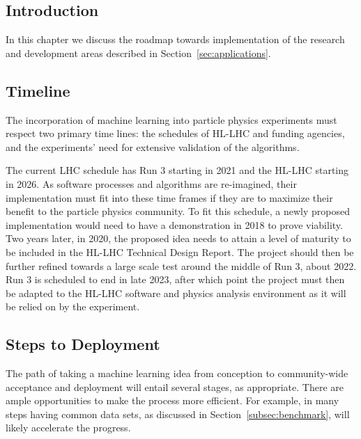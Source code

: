 
\subsection{Introduction}
In this chapter we discuss the roadmap towards implementation of the research and development areas described in Section~\ref{sec:applications}.

\subsection{Timeline}
The incorporation of machine learning into particle physics experiments must respect two primary time lines: the schedules of HL-LHC and funding agencies, and the experiments' need for extensive validation of the algorithms.

The current LHC schedule has Run 3 starting in 2021 and the HL-LHC starting in 2026. As software processes and algorithms are re-imagined, their implementation must fit into these time frames if they are to maximize their benefit to the particle physics community. To fit this schedule, a newly proposed implementation would need to have a demonstration in 2018 to prove viability. Two years later, in 2020, the proposed idea needs to attain a level of maturity to be included in the HL-LHC Technical Design Report. The project should then be further refined towards a large scale test around the middle of Run 3, about 2022. Run 3 is scheduled to end in late 2023, after which point the project must then be adapted to the HL-LHC software and physics analysis environment as it will be relied on by the experiment.
%

\subsection{Steps to Deployment}
The path of taking a machine learning idea from conception to community-wide acceptance and deployment will entail several stages, as appropriate. There are ample opportunities to make the process more efficient. For example, in many steps having common data sets, as discussed in Section~\ref{subsec:benchmark}, will likely accelerate the progress.

